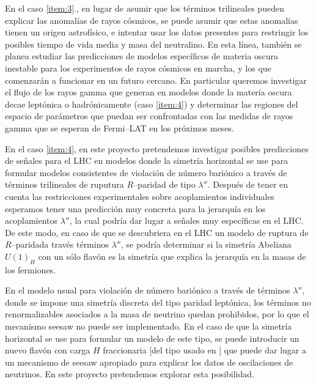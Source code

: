 En el caso \ref{item:3}., en lugar de asumir que los términos trilineales pueden explicar las anomalías de rayos cósmicos, se puede asumir que estas anomalías tienen un origen astrofísico, e intentar usar los datos presentes para restringir los posibles tiempo de vida media y masa del neutralino. En esta línea, también se planea estudiar las predicciones de modelos específicos de materia oscura inestable para los experimentos de rayos cósmicos en marcha, y los que comenzarán a funcionar en un futuro cercano.  En particular queremos  investigar el flujo de los rayos gamma que generan en modelos donde la materia oscura decae leptónica  o hadrónicamente (caso \ref{item:4}) y determinar las regiones del espacio de parámetros que puedan ser confrontadas con las medidas de rayos gamma que se esperan de Fermi--LAT en los próximos meses.

En el caso \ref{item:4}, en este proyecto pretendemos investigar posibles predicciones de señales para el LHC en modelos donde la simetría horizontal se use para formular modelos consistentes de violación de número bariónico a través de términos trilineales de ruputura $R$--paridad de tipo $\lambda''$. Después de tener en cuenta las restricciones experimentales sobre acoplamientos individuales
esperamos tener una predicción muy concreta para la jerarquía en los acoplamientos $\lambda''$, la cual podría dar lugar a señales muy específicas en el LHC. De este modo, en caso de que se descubriera en el LHC un modelo de ruptura de $R$--paridada través términos $\lambda''$, se podría determinar si la simetría Abeliana  $U(1)_H$ con un sólo flavón es la simetría que explica la jerarquía en la masas de los fermiones.

En el modelo usual para violación de número bariónico a través de términos $\lambda''$, donde se impone  una simetría discreta del tipo paridad leptónica, los términos no renormalizables asociados a la masa de neutrino quedan prohibidos, por lo que el mecanismo seesaw no puede ser implementado. En el caso de que la simetría horizontal se use para formular un modelo de este tipo, se puede introducir un nuevo flavón con carga $H$ fraccionaria [del tipo usado en \cite{Chen:2008tc}] que puede dar lugar a un mecanismo de seesaw apropiado para explicar los datos de oscilaciones de neutrinos. En este proyecto pretendemos explorar esta posibilidad.



